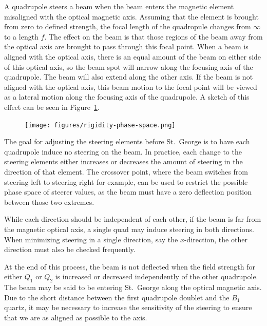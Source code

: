 A quadrupole steers a beam when the beam enters the magnetic element misaligned
with the optical magnetic axis. Assuming that the element is brought from zero
to defined strength, the focal length of the quadropule changes from
$\infty$ to a length $f$. The effect on the beam is that those regions of the
beam away from the optical axis are brought to pass through this focal point.
When a beam is aligned with the optical axis, there is an equal amount of the
beam on either side of this optical axis, so the beam spot will narrow along
the focusing axis of the quadrupole. The beam will also extend along the other
axis. If the beam is not aligned with the
optical axis, this beam motion to the focal point will be viewed as a lateral
motion along the focusing axis of the quadrupole.
A sketch of this effect can be seen in Figure~\ref{fig:steering}.

\begin{figure}[t]
   \begin{center}
       \centerline{\texttt{[image: figures/rigidity-phase-space.png]}}
       \caption[Sketch of quadrupole steering of misaligned beam]{}
       \label{fig:steering}
   \end{center}
\end{figure}

The goal for adjusting the steering elements before St.\ George is to have each
quadrupole induce no steering on the beam. In practice, each change to the
steering elements either increases or decreases the amount of steering in the
direction of that element.
The crossover point, where the beam switches from steering left to steering
right for example, can be used to restrict the possible phase space of steerer
values, as the beam must have a zero deflection position between those two
extremes.

While each direction should be independent of each other, if the beam is far
from the magnetic optical axis, a single quad may induce steering in both
directions. When minimizing steering in a single direction, say the
$x$-direction, the other direction must also be checked frequently.

At the end of this process, the beam is not deflected when the field strength
for either $Q_1$ or $Q_2$ is increased or decreased independently of the other
quadrupole. The beam may be said to be entering St.\ George along the optical
magnetic axis. Due to the short distance between the first quadrupole doublet
and the $B_1$ quartz, it may be necessary to increase the sensitivity of the
steering to ensure that we are as aligned as possible to the axis.

